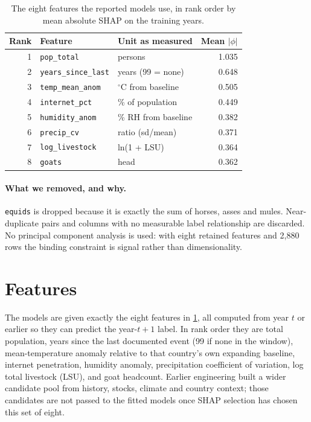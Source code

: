 \documentclass[10pt,openany]{report}
\begin{document}
\begin{table}[htbp]
\centering
\caption[Eight selected features by mean absolute SHAP]{The eight features the reported models use, in rank order by mean absolute SHAP on the
training years.}
\label{tab:selected}
\small
\begin{tabular}{@{}rlp{4.6cm}r@{}}
\toprule
\textbf{Rank} & \textbf{Feature} & \textbf{Unit as measured} & \textbf{Mean $|\phi|$} \\
\midrule
1 & \texttt{pop\_total} & persons & 1.035 \\
2 & \texttt{years\_since\_last} & years (99 = none) & 0.648 \\
3 & \texttt{temp\_mean\_anom} & $^\circ$C from baseline & 0.505 \\
4 & \texttt{internet\_pct} & \% of population & 0.449 \\
5 & \texttt{humidity\_anom} & \% RH from baseline & 0.382 \\
6 & \texttt{precip\_cv} & ratio (sd/mean) & 0.371 \\
7 & \texttt{log\_livestock} & ln(1 + LSU) & 0.364 \\
8 & \texttt{goats} & head & 0.362 \\
\bottomrule
\end{tabular}
\end{table}

\paragraph{What we removed, and why.}
\texttt{equids} is dropped because it is exactly the sum of horses, asses and mules. Near-duplicate
pairs and columns with no measurable label relationship are discarded. No principal component
analysis is used: with eight retained features and 2,880 rows the binding constraint is signal
rather than dimensionality.

\section{Features}
\label{sec:features}

The models are given exactly the eight features in \cref{tab:selected}, all computed from year
$t$ or earlier so they can predict the year-$t{+}1$ label. In rank order they are total population,
years since the last documented event (99 if none in the window), mean-temperature anomaly relative
to that country's own expanding baseline, internet penetration, humidity anomaly, precipitation
coefficient of variation, log total livestock (LSU), and goat headcount. Earlier engineering built a
wider candidate pool from history, stocks, climate and country context; those candidates are not
passed to the fitted models once SHAP selection has chosen this set of eight.
\end{document}
